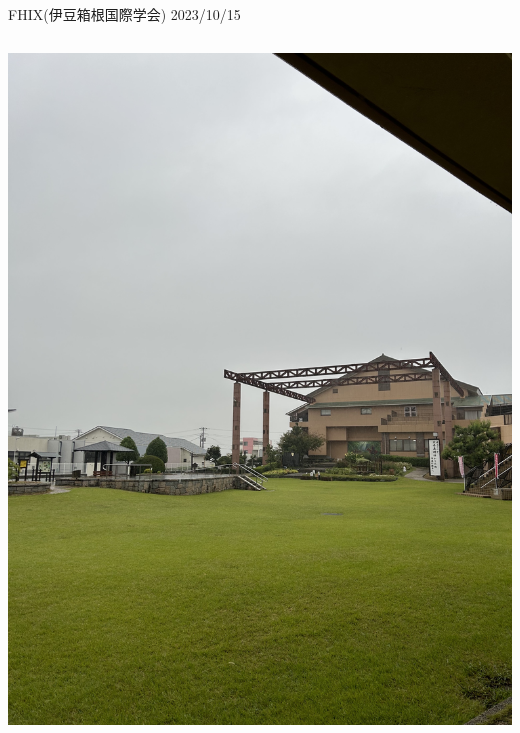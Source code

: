\documentclass[dvipdfmx, unicode]{beamer}
\begin{document}
\begin{frame}[t]{FHIX(伊豆箱根国際学会) 2023/10/15}
\begin{columns}[T]
\begin{column}{0.5\linewidth}
      \includegraphics[scale=0.04]{img/ActiveReport/20231015.png}
    \end{column}
  \end{columns}
\end{frame}
\end{document}
